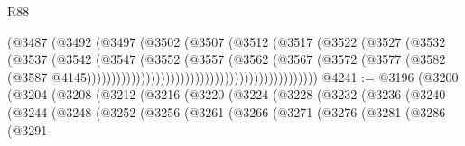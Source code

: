 \begin{lexlean}{R88}
\begin{coremodule}
                                                        (@3487
                                                          (@3492
                                                            (@3497
                                                              (@3502
                                                                (@3507
                                                                  (@3512
                                                                    (@3517
                                                                      (@3522
                                                                        (@3527
                                                                          (@3532
                                                                            (@3537
                                                                              (@3542
                                                                                (@3547
                                                                                  (@3552
                                                                                    (@3557
                                                                                      (@3562
                                                                                        (@3567
                                                                                          (@3572
                                                                                            (@3577
                                                                                              (@3582
                                                                                                (@3587
                                                                                                  @4145)))))))))))))))))))))))))))))))))))))))))))))))
@4241 := @3196
    (@3200
      (@3204
        (@3208
          (@3212
            (@3216
              (@3220
                (@3224
                  (@3228
                    (@3232
                      (@3236
                        (@3240
                          (@3244
                            (@3248
                              (@3252
                                (@3256
                                  (@3261
                                    (@3266
                                      (@3271
                                        (@3276
                                          (@3281
                                            (@3286
                                              (@3291

\end{coremodule}
\end{lexlean}
